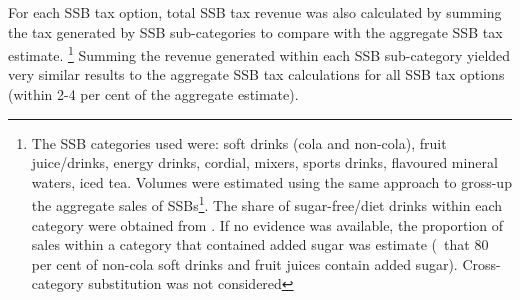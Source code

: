 \documentclass[embargoed]{grattan}
\begin{document}
For each SSB tax option, total SSB tax revenue was also calculated by summing the tax generated by SSB sub-categories to compare with the aggregate SSB tax estimate.%
\footnote{The SSB categories used were: soft drinks (cola and non-cola), fruit juice/drinks, energy drinks, cordial, mixers, sports drinks, flavoured mineral waters, iced tea.
Volumes were estimated using the same approach to gross-up the aggregate sales of SSBs\footcites{IBISWorld2016SoftDrinkManufacturing}{IBISWorld2016FruitJuiceDrink}{Media2015RetailWorldAnnual}.
The share of sugar-free/diet drinks within each category were obtained from \textcite[][Table~1]{Levy2014QuenchingAustraliasthirst}.
If no evidence was available, the proportion of sales within a category that contained added sugar was estimate (\eg~that 80 per cent of non-cola soft drinks and fruit juices contain added sugar).
Cross-category substitution was not considered} Summing the revenue generated within each SSB sub-category yielded very similar results to the aggregate SSB tax calculations for all SSB tax options (within 2-4 per cent of the aggregate estimate).

\printbibliography
\end{document}
